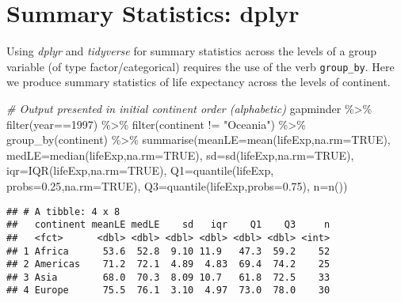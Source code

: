 \documentclass[
]{book}
\newenvironment{Shaded}{\begin{snugshade}}{\end{snugshade}}
\newcommand{\AttributeTok}[1]{\textcolor[rgb]{0.77,0.63,0.00}{#1}}
\newcommand{\CommentTok}[1]{\textcolor[rgb]{0.56,0.35,0.01}{\textit{#1}}}
\newcommand{\ConstantTok}[1]{\textcolor[rgb]{0.00,0.00,0.00}{#1}}
\newcommand{\DecValTok}[1]{\textcolor[rgb]{0.00,0.00,0.81}{#1}}
\newcommand{\FloatTok}[1]{\textcolor[rgb]{0.00,0.00,0.81}{#1}}
\newcommand{\FunctionTok}[1]{\textcolor[rgb]{0.00,0.00,0.00}{#1}}
\newcommand{\NormalTok}[1]{#1}
\newcommand{\SpecialCharTok}[1]{\textcolor[rgb]{0.00,0.00,0.00}{#1}}
\newcommand{\StringTok}[1]{\textcolor[rgb]{0.31,0.60,0.02}{#1}}
\begin{document}
\hypertarget{summary-statistics-dplyr}{%
\section{Summary Statistics: dplyr}\label{summary-statistics-dplyr}}

Using \emph{dplyr} and \emph{tidyverse} for summary statistics across the levels of a group variable (of type factor/categorical) requires the use of the verb \texttt{group\_by}. Here we produce summary statistics of life expectancy across the levels of continent.

\begin{Shaded}
\begin{Highlighting}[]
\CommentTok{\# Output presented in initial continent order (alphabetic)}
\NormalTok{gapminder }\SpecialCharTok{\%\textgreater{}\%} \FunctionTok{filter}\NormalTok{(year}\SpecialCharTok{==}\DecValTok{1997}\NormalTok{) }\SpecialCharTok{\%\textgreater{}\%} 
  \FunctionTok{filter}\NormalTok{(continent }\SpecialCharTok{!=} \StringTok{"Oceania"}\NormalTok{) }\SpecialCharTok{\%\textgreater{}\%} 
  \FunctionTok{group\_by}\NormalTok{(continent) }\SpecialCharTok{\%\textgreater{}\%} 
  \FunctionTok{summarise}\NormalTok{(}\AttributeTok{meanLE=}\FunctionTok{mean}\NormalTok{(lifeExp,}\AttributeTok{na.rm=}\ConstantTok{TRUE}\NormalTok{),}
            \AttributeTok{medLE=}\FunctionTok{median}\NormalTok{(lifeExp,}\AttributeTok{na.rm=}\ConstantTok{TRUE}\NormalTok{),}
            \AttributeTok{sd=}\FunctionTok{sd}\NormalTok{(lifeExp,}\AttributeTok{na.rm=}\ConstantTok{TRUE}\NormalTok{),}
            \AttributeTok{iqr=}\FunctionTok{IQR}\NormalTok{(lifeExp,}\AttributeTok{na.rm=}\ConstantTok{TRUE}\NormalTok{),}
            \AttributeTok{Q1=}\FunctionTok{quantile}\NormalTok{(lifeExp, }\AttributeTok{probs=}\FloatTok{0.25}\NormalTok{,}\AttributeTok{na.rm=}\ConstantTok{TRUE}\NormalTok{),}
            \AttributeTok{Q3=}\FunctionTok{quantile}\NormalTok{(lifeExp,}\AttributeTok{probs=}\FloatTok{0.75}\NormalTok{),}
            \AttributeTok{n=}\FunctionTok{n}\NormalTok{())}
\end{Highlighting}
\end{Shaded}

\begin{verbatim}
## # A tibble: 4 x 8
##   continent meanLE medLE    sd   iqr    Q1    Q3     n
##   <fct>      <dbl> <dbl> <dbl> <dbl> <dbl> <dbl> <int>
## 1 Africa      53.6  52.8  9.10 11.9   47.3  59.2    52
## 2 Americas    71.2  72.1  4.89  4.83  69.4  74.2    25
## 3 Asia        68.0  70.3  8.09 10.7   61.8  72.5    33
## 4 Europe      75.5  76.1  3.10  4.97  73.0  78.0    30
\end{verbatim}
\end{document}
